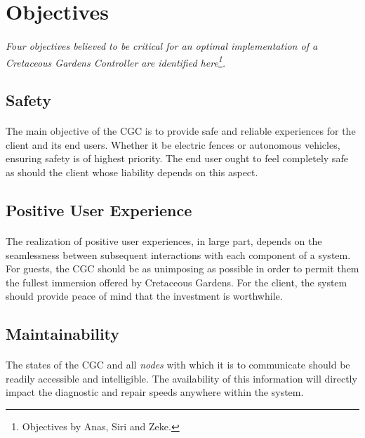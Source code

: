 \documentclass[12pt]{article}
\begin{document}
\section{Objectives}
\label{obj}
\paragraph{} \textit{Four objectives believed to be critical for an 
optimal implementation of a \textit{Cretaceous Gardens Controller} are identified 
here\footnote{Objectives by Anas, Siri and Zeke.}.}
 
	\subsection{Safety}\label{saf}
	\paragraph{} The main objective of the CGC is to provide safe and reliable 
	experiences for the client and its end users. Whether it be electric fences 
	or autonomous vehicles, ensuring safety is of highest priority. The end user
	ought to feel completely safe as should the client whose liability depends on
	this aspect.

	\subsection{Positive User Experience}\label{use}
	\paragraph{} The realization of positive user experiences, in large part, 
	depends on the seamlessness between subsequent interactions with each component
	of a system. For guests, the CGC should be as unimposing as possible in order
	to permit them the fullest immersion offered by Cretaceous Gardens. For the client,
	the system should provide peace of mind that the investment is worthwhile.

	\subsection{Maintainability}\label{mai}
	\paragraph{} The states of the CGC and all \textit{nodes} with which it is to
	communicate should be readily accessible and intelligible. The availability  
	of this information will directly impact the diagnostic and repair speeds 
	anywhere within the system.
	
\end{document}
